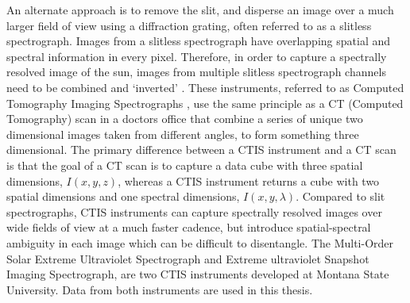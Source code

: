 An alternate approach is to remove the slit, and disperse an image over a much larger field of view using a diffraction grating, often referred to as a slitless spectrograph.
Images from a slitless spectrograph have overlapping spatial and spectral information in every pixel.
Therefore, in order to capture a spectrally resolved image of the sun, images from multiple slitless spectrograph channels need to be combined and `inverted' \citep[e.g.][]{KakSlaney2001}.
These instruments, referred to as Computed Tomography Imaging Spectrographs \citep[CTIS:][]{DescourDereniakCTIS1995}, use the same principle as a CT (Computed Tomography) scan in a doctors office that combine a series of unique two dimensional images taken from different angles, to form something three dimensional.
The primary difference between a CTIS instrument and a CT scan is that the goal of a CT scan is to capture a data cube with three spatial dimensions, $I(x,y,z)$, whereas a CTIS instrument returns a cube with two spatial dimensions and one spectral dimensions, $I(x,y,\lambda)$.
Compared to slit spectrographs, CTIS instruments can capture spectrally resolved images over wide fields of view at a much faster cadence, but introduce spatial-spectral ambiguity in each image which can be difficult to disentangle.
The Multi-Order Solar Extreme Ultraviolet Spectrograph \citep[MOSES:{}][]{Fox2010} and Extreme ultraviolet Snapshot Imaging Spectrograph\citep[ESIS:][]{ESIS}, are two CTIS instruments developed at Montana State University.
Data from both instruments are used in this thesis.

